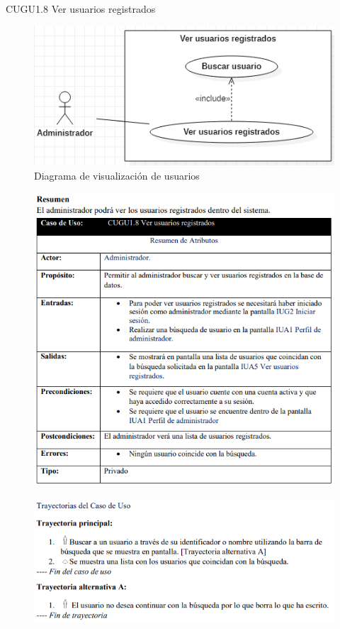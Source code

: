 \documentclass[12pt,letterpaper]{article}
\begin{document}
            \newpage
            CUGU1.8 Ver usuarios registrados 
            \begin{figure}[H]
                \centering
                \includegraphics [scale=0.6]{casosUso/verUsuariosRegistrados}
                \caption{Diagrama de visualización de usuarios}
            \end{figure}
            \begin{figure}[H]
                \centering
                \includegraphics [scale=0.8]{specs/specVerUsuario}
            \end{figure}
            \begin{figure}[H]
                \centering
                \includegraphics [scale=0.9]{specs/trayVerUsuario}
            \end{figure}
\end{document}
